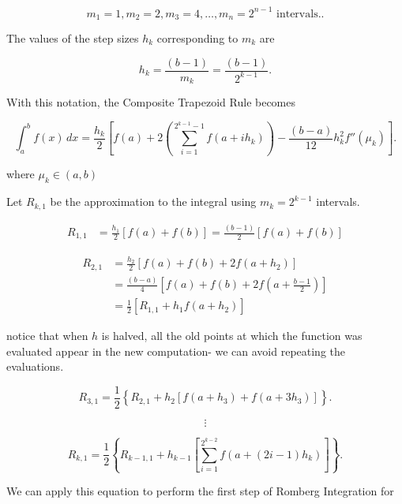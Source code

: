 \[
  m_1 = 1, m_2 = 2, m_3 = 4, \dots, m_n = 2^{n-1} \text{ intervals.} 
.\]

The values of the step sizes $h_k$ corresponding to $m_k$ are 

\[
  h_k = \frac{(b-1)}{m_k} = \frac{(b-1)}{2^{k-1}}
.\]

With this notation, the Composite Trapezoid Rule becomes

\begin{equation*}
  \int_{a}^{b} f(x) \, dx = \frac{h_k}{2} \left[
    f(a) + 2\left(
      \sum_{i=1}^{2^{k-1}-1} f(a+ih_k) 
      \right)
      - \frac{(b-a)}{12} h^2_k f''(\mu_k)
  \right]
.\end{equation*}

where $\mu_k \in (a,b)$

Let $R_{k,1}$ be the approximation to the integral using $m_k=2^{k-1}$
intervals.

\ie 

\begin{align*}
  R_{1,1} &=  \frac{h_1}{2}\left[
    f(a)+f(b)
  \right] = \frac{(b-1)}{2}
  \left[
    f(a)+f(b)
  \right]
\end{align*}

\begin{align*}
  R_{2,1} &= \frac{h_2}{2} \left[
    f(a)+f(b)+2f(a+h_2)
  \right] \\
          &= \frac{(b-a)}{4} \left[
            f(a)+f(b)+2f(a+\frac{b-1}{2})
          \right] \\
          &= \frac{1}{2} \left[
            R_{1,1} + h_1f(a+h_2)
          \right]
\end{align*}

notice that when $h$ is halved, all the old points at which the function was
evaluated appear in the new computation- we can avoid repeating the evaluations.

\begin{equation*}
  R_{3,1} = \frac{1}{2} \left\{
    R_{2,1} + h_2 \left[
      f(a+h_3) + f(a+3h_3)
    \right]
  \right\}
.\end{equation*} 

\[
\vdots
\]

\begin{equation*}
  R_{k,1} = \frac{1}{2} \left\{
    R_{k-1,1} + h_{k-1} \left[
      \sum_{i=1}^{2^{k-2}} f(a+(2i-1)h_k)
    \right]
  \right\}
.\end{equation*}

We can apply this equation to perform the first step of Romberg Integration for

